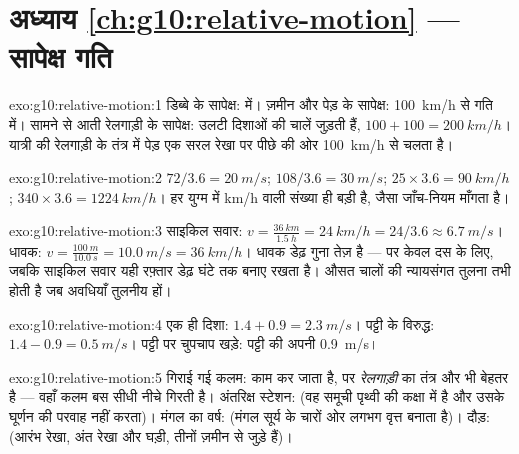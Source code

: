 \section*{अध्याय \ref{ch:g10:relative-motion} --- सापेक्ष गति}

\begin{solution}{exo:g10:relative-motion:1}
डिब्बे के सापेक्ष:  में। ज़मीन और पेड़ के सापेक्ष: \qty{100}{km/h} से
गति में। सामने से आती रेलगाड़ी के सापेक्ष: उलटी दिशाओं की चालें जुड़ती
हैं, $100 + 100 = \qty{200}{km/h}$। यात्री की रेलगाड़ी के तंत्र में पेड़ एक सरल रेखा पर पीछे की
ओर \qty{100}{km/h} से चलता है।
\end{solution}

\begin{solution}{exo:g10:relative-motion:2}
$72 / 3.6 = \qty{20}{m/s}$; $108 / 3.6 = \qty{30}{m/s}$; $25 \times 3.6 = \qty{90}{km/h}$; $340 \times 3.6 = \qty{1224}{km/h}$। हर युग्म में \unit{km/h} वाली संख्या ही बड़ी है,
जैसा जाँच-नियम माँगता है।
\end{solution}

\begin{solution}{exo:g10:relative-motion:3}
साइकिल सवार: $v = \frac{\qty{36}{km}}{\qty{1.5}{h}} = \qty{24}{km/h}
= 24/3.6 \approx \qty{6.7}{m/s}$। धावक: $v = \frac{\qty{100}{m}}{\qty{10.0}{s}} = \qty{10.0}{m/s}
= \qty{36}{km/h}$। धावक डेढ़ गुना तेज़ है --- पर केवल
दस  के लिए, जबकि साइकिल सवार यही रफ़्तार डेढ़ घंटे तक बनाए रखता है।
औसत चालों की न्यायसंगत तुलना तभी होती है जब अवधियाँ तुलनीय हों।
\end{solution}

\begin{solution}{exo:g10:relative-motion:4}
एक ही दिशा: $1.4 + 0.9 = \qty{2.3}{m/s}$। पट्टी के विरुद्ध: $1.4 - 0.9 = \qty{0.5}{m/s}$। पट्टी पर चुपचाप खड़े:
पट्टी की अपनी \qty{0.9}{m/s}।
\end{solution}

\begin{solution}{exo:g10:relative-motion:5}
गिराई गई कलम:  काम कर जाता है, पर
\emph{रेलगाड़ी} का तंत्र और भी बेहतर है --- वहाँ कलम बस सीधी नीचे गिरती
है। अंतरिक्ष स्टेशन:  (वह समूची पृथ्वी की
कक्षा में है और उसके घूर्णन की परवाह नहीं करता)। मंगल का वर्ष:
 (मंगल सूर्य के चारों ओर लगभग वृत्त बनाता
है)। दौड़:  (आरंभ रेखा, अंत रेखा और घड़ी, तीनों
ज़मीन से जुड़े हैं)।
\end{solution}

